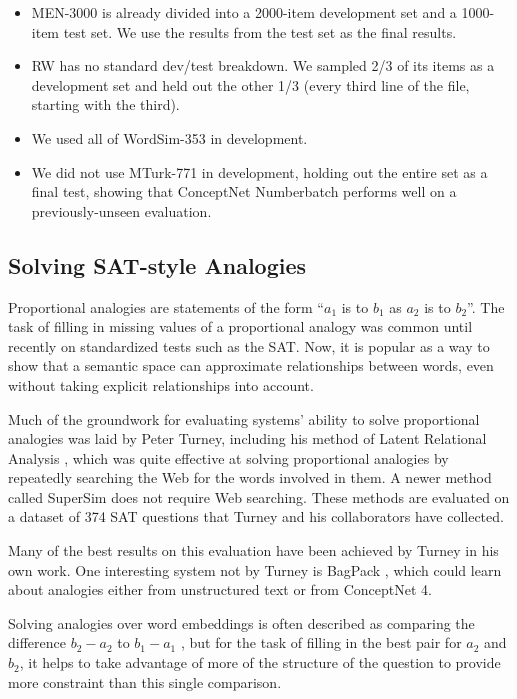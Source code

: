 \documentclass[letterpaper]{article}
\begin{document}
\begin{itemize}
\item
    MEN-3000 is already divided into a 2000-item development set and a
    1000-item test set. We use the results from the test set as the final results.
\item
    RW has no standard dev/test breakdown. We sampled 2/3 of its items as
    a development set and held out the other 1/3 (every third line of the file,
    starting with the third).
\item
    We used all of WordSim-353 in development.
\item
    We did not use MTurk-771 in development, holding out the entire set
    as a final test, showing that ConceptNet Numberbatch performs well on a
    previously-unseen evaluation.
\end{itemize}

\subsection{Solving SAT-style Analogies}

Proportional analogies are statements of the form ``$a_1$ is to $b_1$ as $a_2$
is to $b_2$''. The task of filling in missing values of a proportional analogy
was common until recently on standardized tests such as the SAT. Now, it is
popular as a way to show that a semantic space can approximate relationships
between words, even without taking explicit relationships into account.

Much of the groundwork for evaluating systems' ability to solve proportional
analogies was laid by Peter Turney, including his method of Latent Relational
Analysis \cite{turney2005lra}, which was quite effective at solving
proportional analogies by repeatedly searching the Web for the words involved
in them. A newer method called SuperSim \cite{turney2013supersim} does
not require Web searching. These methods are evaluated on a dataset of 374 SAT
questions that Turney and his collaborators have collected.

Many of the best results on this evaluation have been achieved by Turney in his
own work. One interesting system not by Turney is BagPack
\cite{herdagdelen2009bagpack}, which could learn about analogies either from
unstructured text or from ConceptNet 4.

Solving analogies over word embeddings is often described as comparing the
difference $b_2 - a_2$ to $b_1 - a_1$ \cite{mikolov2013word2vec}, but for the
task of filling in the best pair for $a_2$ and $b_2$, it helps to take
advantage of more of the structure of the question to provide more constraint
than this single comparison.
\end{document}
